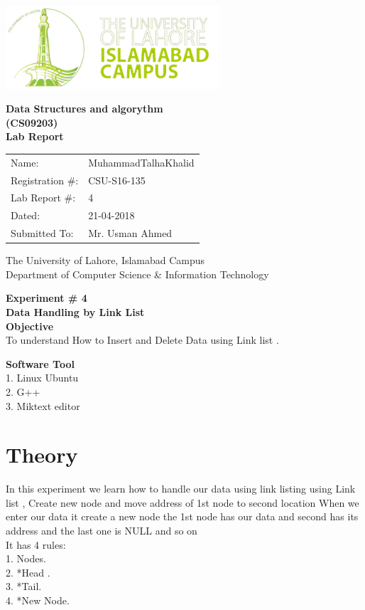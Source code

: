 \documentclass[11pt]{article}            %
\begin{document}
\begin{titlepage}
    \centering
  \vfill
    \includegraphics[width=8cm]{uni_logo.png} \\ 
	\vskip2cm
    {\bfseries\Large
	Data Structures and algorythm  \\ (CS09203)\\
	
	\vskip2cm
	Lab Report 
	 
	\vskip2cm
	}    

\begin{center}
\begin{tabular}{ l l  } 

Name: & MuhammadTalhaKhalid \\ 
Registration \#: &CSU-S16-135\\ 
Lab Report \#: & 4 \\ 
 Dated:& 21-04-2018\\ 
Submitted To:& Mr. Usman Ahmed\\ 

\end{tabular}
\end{center}
    \vfill
    The University of Lahore, Islamabad Campus\\
Department of Computer Science \& Information Technology
\end{titlepage}


    
    {\bfseries\Large
\centering
	Experiment \# 4 \\

Data Handling  by Link List\\
	
	}    
 \vskip1cm
 \textbf {Objective}\\  To understand How to Insert and Delete Data using Link list .
 
 \textbf {Software Tool} \\
1. Linux Ubuntu \\
2. G++\\
3. Miktext editor \\

\section{Theory }              
In this experiment we learn how to handle our data using  link listing using Link list , Create new node and move address of 1st node to second location When we enter our data it create a new node the 1st node has our data and second has its address and the last one is NULL and so on \\
It has 4 rules:\\
1.	Nodes.\\
2.	*Head .\\ 
3.	*Tail.\\ 
4.	*New Node.\\ 
\end{document}
